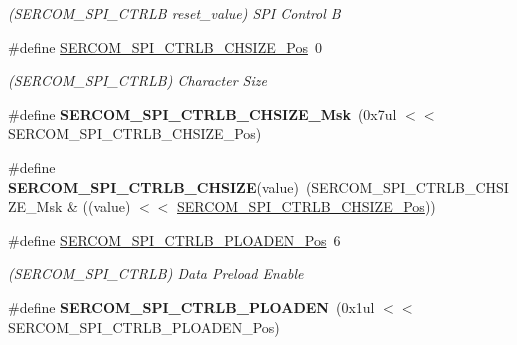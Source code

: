 \begin{DoxyCompactItemize}
\begin{DoxyCompactList}\small\item\em (S\+E\+R\+C\+O\+M\+\_\+\+S\+P\+I\+\_\+\+C\+T\+R\+L\+B reset\+\_\+value) S\+P\+I Control B \end{DoxyCompactList}\item 
\hypertarget{group___s_a_m_l21___s_e_r_c_o_m_gafb3a3447ea56a377ecdc8eba9faa21ab}{}\#define \hyperlink{group___s_a_m_l21___s_e_r_c_o_m_gafb3a3447ea56a377ecdc8eba9faa21ab}{S\+E\+R\+C\+O\+M\+\_\+\+S\+P\+I\+\_\+\+C\+T\+R\+L\+B\+\_\+\+C\+H\+S\+I\+Z\+E\+\_\+\+Pos}~0\label{group___s_a_m_l21___s_e_r_c_o_m_gafb3a3447ea56a377ecdc8eba9faa21ab}

\begin{DoxyCompactList}\small\item\em (S\+E\+R\+C\+O\+M\+\_\+\+S\+P\+I\+\_\+\+C\+T\+R\+L\+B) Character Size \end{DoxyCompactList}\item 
\hypertarget{group___s_a_m_l21___s_e_r_c_o_m_ga291c7d819f4a2fbbda0e9a0541b8fdab}{}\#define {\bfseries S\+E\+R\+C\+O\+M\+\_\+\+S\+P\+I\+\_\+\+C\+T\+R\+L\+B\+\_\+\+C\+H\+S\+I\+Z\+E\+\_\+\+Msk}~(0x7ul $<$$<$ S\+E\+R\+C\+O\+M\+\_\+\+S\+P\+I\+\_\+\+C\+T\+R\+L\+B\+\_\+\+C\+H\+S\+I\+Z\+E\+\_\+\+Pos)\label{group___s_a_m_l21___s_e_r_c_o_m_ga291c7d819f4a2fbbda0e9a0541b8fdab}

\item 
\hypertarget{group___s_a_m_l21___s_e_r_c_o_m_ga1883bdcc91edc096fe92d494f5343b27}{}\#define {\bfseries S\+E\+R\+C\+O\+M\+\_\+\+S\+P\+I\+\_\+\+C\+T\+R\+L\+B\+\_\+\+C\+H\+S\+I\+Z\+E}(value)~(S\+E\+R\+C\+O\+M\+\_\+\+S\+P\+I\+\_\+\+C\+T\+R\+L\+B\+\_\+\+C\+H\+S\+I\+Z\+E\+\_\+\+Msk \& ((value) $<$$<$ \hyperlink{group___s_a_m_l21___s_e_r_c_o_m_gafb3a3447ea56a377ecdc8eba9faa21ab}{S\+E\+R\+C\+O\+M\+\_\+\+S\+P\+I\+\_\+\+C\+T\+R\+L\+B\+\_\+\+C\+H\+S\+I\+Z\+E\+\_\+\+Pos}))\label{group___s_a_m_l21___s_e_r_c_o_m_ga1883bdcc91edc096fe92d494f5343b27}

\item 
\hypertarget{group___s_a_m_l21___s_e_r_c_o_m_ga360c363f5807b2fc40b905e3b61bff2c}{}\#define \hyperlink{group___s_a_m_l21___s_e_r_c_o_m_ga360c363f5807b2fc40b905e3b61bff2c}{S\+E\+R\+C\+O\+M\+\_\+\+S\+P\+I\+\_\+\+C\+T\+R\+L\+B\+\_\+\+P\+L\+O\+A\+D\+E\+N\+\_\+\+Pos}~6\label{group___s_a_m_l21___s_e_r_c_o_m_ga360c363f5807b2fc40b905e3b61bff2c}

\begin{DoxyCompactList}\small\item\em (S\+E\+R\+C\+O\+M\+\_\+\+S\+P\+I\+\_\+\+C\+T\+R\+L\+B) Data Preload Enable \end{DoxyCompactList}\item 
\hypertarget{group___s_a_m_l21___s_e_r_c_o_m_ga2c58504671f7e78f8418ab2b1869b35b}{}\#define {\bfseries S\+E\+R\+C\+O\+M\+\_\+\+S\+P\+I\+\_\+\+C\+T\+R\+L\+B\+\_\+\+P\+L\+O\+A\+D\+E\+N}~(0x1ul $<$$<$ S\+E\+R\+C\+O\+M\+\_\+\+S\+P\+I\+\_\+\+C\+T\+R\+L\+B\+\_\+\+P\+L\+O\+A\+D\+E\+N\+\_\+\+Pos)\label{group___s_a_m_l21___s_e_r_c_o_m_ga2c58504671f7e78f8418ab2b1869b35b}


\end{DoxyCompactItemize}
